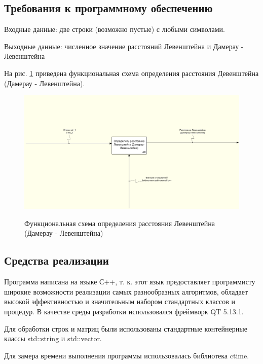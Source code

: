 \documentclass[a4paper,12pt]{article}
\begin{document}
	\subsection{Требования к программному обеспечению}
	Входные данные: две строки (возможно пустые) с любыми символами.
	
	Выходные данные: численное значение расстояний Левенштейна и Дамерау - Левенштейна
	
	На рис. \ref{fig:idef0} приведена функциональная схема определения расстояния Девенштейна (Дамерау - Левенштейна).
        
        \begin{figure}[h!]
        	\begin{center}
        		{\includegraphics[width = \textwidth]{idef0.png}}
        		\caption{Функциональная схема определения расстояния Левенштейна (Дамерау - Левенштейна)}
        		\label{fig:idef0}
        	\end{center}
        \end{figure}
        
	
	\subsection{Средства реализации}
	Программа написана на языке С++, т. к. этот язык предоставляет программисту широкие возможности реализации самых разнообразных алгоритмов, обладает высокой эффективностью и значительным набором стандартных классов и процедур. В качестве среды разработки использовался  фреймворк QT 5.13.1.
	
	Для обработки строк и матриц были использованы стандартные контейнерные классы std::string и std::vector.
	
	Для замера времени выполнения программы использовалась библиотека ctime.
	
\end{document}
